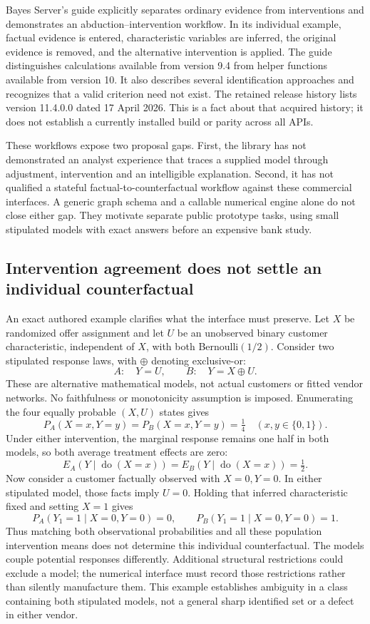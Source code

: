 Bayes Server's guide explicitly separates ordinary evidence from
interventions and demonstrates an abduction--intervention workflow. In its
individual example, factual evidence is entered, characteristic variables
are inferred, the original evidence is removed, and the alternative
intervention is applied. The guide distinguishes calculations available
from version 9.4 from helper functions available from version 10. It also
describes several identification approaches and recognizes that a valid
criterion need not exist. The retained release history lists version
11.4.0.0 dated 17 April 2026. This is a fact about that acquired history; it
does not establish a currently installed build or parity across all APIs.
\citep{exec13_ci_bayesserver_causality,exec14_ci_release_history}

These workflows expose two proposal gaps. First, the library has not
demonstrated an analyst experience that traces a supplied model through
adjustment, intervention and an intelligible explanation. Second, it has
not qualified a stateful factual-to-counterfactual workflow against these
commercial interfaces. A generic graph schema and a callable numerical
engine alone do not close either gap. They motivate separate public
prototype tasks, using small stipulated models with exact answers before
an expensive bank study.~\citep{exec25_bn_commercial_choice}

\subsection{Intervention agreement does not settle an individual counterfactual}

An exact authored example clarifies what the interface must preserve. Let
$X$ be randomized offer assignment and let $U$ be an unobserved binary
customer characteristic, independent of $X$, with both Bernoulli$(1/2)$.
Consider two stipulated response laws, with $\oplus$ denoting exclusive-or:
\[
 A:\quad Y=U,\qquad B:\quad Y=X\oplus U.
\]
These are alternative mathematical models, not actual customers or fitted
vendor networks. No faithfulness or monotonicity assumption is imposed.
Enumerating the four equally probable $(X,U)$ states gives
\[
 P_A(X=x,Y=y)=P_B(X=x,Y=y)=\tfrac14
 \quad(x,y\in\{0,1\}).
\]
Under either intervention, the marginal response remains one half in both
models, so both average treatment effects are zero:
\[
 E_A(Y\mid\operatorname{do}(X=x))
 =E_B(Y\mid\operatorname{do}(X=x))=\tfrac12.
\]
Now consider a customer factually observed with $X=0,Y=0$. In either
stipulated model, those facts imply $U=0$. Holding that inferred
characteristic fixed and setting $X=1$ gives
\[
 P_A(Y_1=1\mid X=0,Y=0)=0,\qquad
 P_B(Y_1=1\mid X=0,Y=0)=1.
\]
Thus matching both observational probabilities and all these population
intervention means does not determine this individual counterfactual. The
models couple potential responses differently. Additional structural
restrictions could exclude a model; the numerical interface must record
those restrictions rather than silently manufacture them. This example
establishes ambiguity in a class containing both stipulated models, not a
general sharp identified set or a defect in either vendor.
\citep{exec25_bn_commercial_choice}

